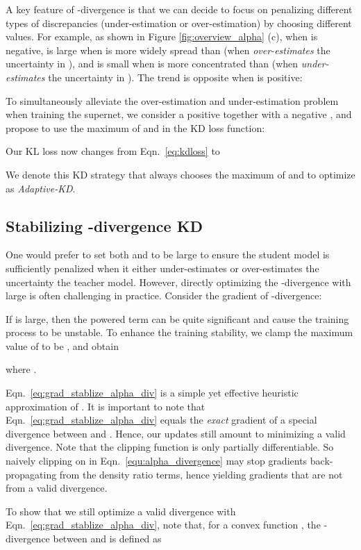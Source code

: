 \documentclass{article}
\begin{document}
A key feature of -divergence is that we can decide to focus on penalizing different types of discrepancies (under-estimation or over-estimation) by choosing different  values. 
For example, 
as shown in Figure \ref{fig:overview_alpha} (c), 
when  is negative, 
 is large when  is more widely spread than 
(when  \emph{over-estimates} the uncertainty in ), 
and is small when  is more concentrated than  
(when  \emph{under-estimates} the uncertainty in ). 
The trend is opposite when  is positive: 


To simultaneously alleviate the over-estimation and under-estimation problem when training the supernet, we consider a positive  together with a negative , and propose to
use the maximum of 
and  in the KD loss function: 


Our KL loss now changes from  Eqn.~\eqref{eq:kdloss} to 

We denote this KD strategy that always chooses the maximum of  and  to optimize as \emph{Adaptive-KD}. 


\subsection{Stabilizing -divergence KD}
\label{sec:stablize}

One would prefer to set both  and  to be large to ensure the student model is sufficiently penalized when it either under-estimates or over-estimates the uncertainty the teacher model.
However, 
directly optimizing the -divergence with large  is often challenging in practice. 
Consider the gradient of -divergence:

If  is large, then the powered term  can be quite significant and cause the training process to be unstable.
To enhance the training stability, we clamp the maximum value of  to be , and obtain 

where
 . 

Eqn.~\eqref{eq:grad_stablize_alpha_div} is a simple yet effective heuristic approximation of . It is important to note that Eqn.~\eqref{eq:grad_stablize_alpha_div} equals the \emph{exact} gradient of a special  divergence between  and . Hence, our updates still amount to minimizing a valid divergence. 
Note that the clipping function  is only partially differentiable. 
So naively clipping on  in Eqn.~\eqref{equ:alpha_divergence} may stop gradients back-propagating from the density ratio terms, 
hence yielding gradients that are not from a valid divergence. 

To show that we still optimize a valid divergence with Eqn.~\eqref{eq:grad_stablize_alpha_div}, note that, for a convex function , 
the -divergence between  and  is defined as 
\end{document}
